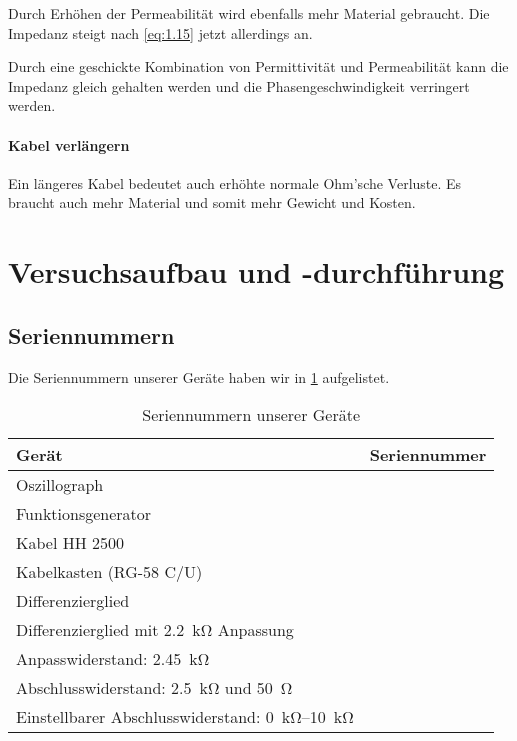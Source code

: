 Durch Erhöhen der Permeabilität wird ebenfalls mehr Material gebraucht. Die
Impedanz steigt nach \eqref{eq:1.15} jetzt allerdings an.

Durch eine geschickte Kombination von Permittivität und Permeabilität kann die
Impedanz gleich gehalten werden und die Phasengeschwindigkeit verringert
werden.

\paragraph{Kabel verlängern}

Ein längeres Kabel bedeutet auch erhöhte normale Ohm'sche Verluste. Es braucht
auch mehr Material und somit mehr Gewicht und Kosten.


\section{Versuchsaufbau und -durchführung}

\subsection{Seriennummern}

Die Seriennummern unserer Geräte haben wir in \cref{tb:seriennummern} aufgelistet.

\begin{table}[h]
	\center
	\caption{Seriennummern unserer Geräte}
	\label{tb:seriennummern}
	\begin{tabular}{ll}
		Gerät & Seriennummer \\
		\hline
		Oszillograph & \\
		Funktionsgenerator & \\
		Kabel HH 2500 & \\
		Kabelkasten (RG-58 C/U) & \\
		Differenzierglied & \\
		Differenzierglied mit \SI{2.2}{\kilo\ohm} Anpassung & \\
		Anpasswiderstand: \SI{2.45}{\kilo\ohm} & \\
		Abschlusswiderstand: \SI{2.5}{\kilo\ohm} und \SI{50}{\ohm} & \\
		Einstellbarer Abschlusswiderstand: \SIrange{0}{10}{\kilo\ohm} &
	\end{tabular}
\end{table}

